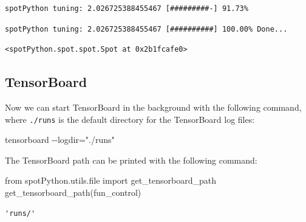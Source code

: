 \documentclass[
  letterpaper,
  DIV=11,
  numbers=noendperiod]{scrreprt}
\newenvironment{Shaded}{\begin{snugshade}}{\end{snugshade}}
\newcommand{\BuiltInTok}[1]{\textcolor[rgb]{0.00,0.23,0.31}{#1}}
\newcommand{\ImportTok}[1]{\textcolor[rgb]{0.00,0.46,0.62}{#1}}
\newcommand{\NormalTok}[1]{\textcolor[rgb]{0.00,0.23,0.31}{#1}}
\begin{document}
\begin{verbatim}
spotPython tuning: 2.026725388455467 [#########-] 91.73% 
\end{verbatim}

\begin{verbatim}
spotPython tuning: 2.026725388455467 [##########] 100.00% Done...
\end{verbatim}

\begin{verbatim}
<spotPython.spot.spot.Spot at 0x2b1fcafe0>
\end{verbatim}

\hypertarget{sec-tensorboard-10}{%
\subsection{TensorBoard}\label{sec-tensorboard-10}}

Now we can start TensorBoard in the background with the following
command, where \texttt{./runs} is the default directory for the
TensorBoard log files:

\begin{Shaded}
\begin{Highlighting}[]
\NormalTok{tensorboard {-}{-}logdir="./runs"}
\end{Highlighting}
\end{Shaded}

\begin{tcolorbox}[enhanced jigsaw, titlerule=0mm, colbacktitle=quarto-callout-tip-color!10!white, coltitle=black, arc=.35mm, toptitle=1mm, colback=white, left=2mm, opacityback=0, bottomtitle=1mm, bottomrule=.15mm, breakable, opacitybacktitle=0.6, colframe=quarto-callout-tip-color-frame, rightrule=.15mm, toprule=.15mm, leftrule=.75mm, title=\textcolor{quarto-callout-tip-color}{\faLightbulb}\hspace{0.5em}{Tip: TENSORBOARD\_PATH}]

The TensorBoard path can be printed with the following command:

\begin{Shaded}
\begin{Highlighting}[]
\ImportTok{from}\NormalTok{ spotPython.utils.}\BuiltInTok{file} \ImportTok{import}\NormalTok{ get\_tensorboard\_path}
\NormalTok{get\_tensorboard\_path(fun\_control)}
\end{Highlighting}
\end{Shaded}

\begin{verbatim}
'runs/'
\end{verbatim}

\end{tcolorbox}
\end{document}

